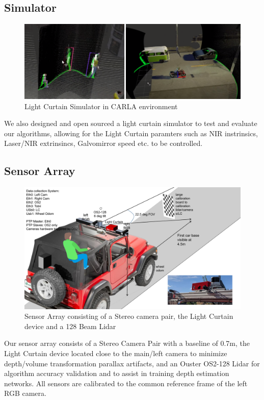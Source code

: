 \subsection{Simulator}

\begin{figure}[h]
   \centering
   \begin{minipage}{0.4\textwidth}
       \centering
       \includegraphics[width=1.0\textwidth]{figures/sim.png}
   \end{minipage}\hfill
   \centering
   \caption{Light Curtain Simulator in CARLA environment}
\end{figure}
\vspace{-.1in}
We also designed and open sourced a light curtain simulator to test and evaluate our algorithms, allowing for the Light Curtain paramters such as NIR instrinsics, Laser/NIR extrinsincs, Galvomirror speed etc. to be controlled.

\subsection{Sensor Array}

\begin{figure}[h]
   \centering
   \begin{minipage}{0.5\textwidth}
       \centering
       \includegraphics[width=1.0\textwidth]{figures/array.pdf}
   \end{minipage}\hfill
   \centering
   \caption{Sensor Array consisting of a Stereo camera pair, the Light Curtain device and a 128 Beam Lidar}
\end{figure}

Our sensor array consists of a Stereo Camera Pair with a baseline of 0.7m, the Light Curtain device located close to the main/left camera to minimize depth/volume transformation parallax artifacts, and an Ouster OS2-128 Lidar for algorithm accuracy validation and to assist in training depth estimation networks. All sensors are calibrated to the common reference frame of the left RGB camera.